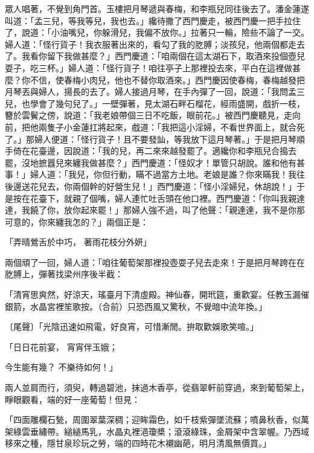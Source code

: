 眾人唱著，不覺到角門首。玉樓把月琴遞與春梅，和李瓶兒同往後去了。潘金蓮遂叫道：「孟三兒，等我等兒，我也去。」纔待撒了西門慶走，被西門慶一把手拉住了，說道：「小油嘴兒，你躲滑兒，我偏不放你。」拉著只一輪，險些不論了一交。婦人道：「怪行貨子！我衣服著出來的，看勾了我的肐膊；淡孩兒，他兩個都走去了。我看你留下我做甚麼？」西門慶道：「咱兩個在這太湖石下，取酒來投個壺兒耍子，吃三杯。」婦人道：「怪行貨子！咱往亭子上那裡投去來，平白在這裡做甚麼？你不信，使春梅小肉兒，他也不替你取酒來。」西門慶因使春梅，春梅越發把月琴丟與婦人，揚長的去了。婦人接過月琴，在手內彈了一回，說道：「我問孟三兒，也學會了幾句兒了。」一壁彈著，見太湖石畔石榴花，經雨盛開，戲折一枝，簪於雲鬢之傍，說道：「我老娘帶個三日不吃飯，眼前花。」被西門慶聽見，走向前，把他兩隻子小金蓮扛將起來，戲道：「我把這小淫婦，不看世界面上，就合死了。」那婦人便道：「怪行貨子！且不要發訕，等我放下這月琴著。」于是把月琴順手倚在花臺邊，因說道：「我的兒，再二來來越發罷了。適纔你和李瓶兒合搗去罷，沒地摭囂兒來纏我做甚麼？」西門慶道：「怪奴才！單管只胡說。誰和他有甚事！」婦人道：「我兒，你但行動，瞞不過當方土地。老娘是誰？你來瞞我！我往後邊送花兒去，你兩個幹的好營生兒！」西門慶道：「怪小淫婦兒，休胡說！」于是按在花臺下，就親了個嘴，婦人連忙吐舌頭在他口裡。西門慶道：「你叫我親達達，我饒了你，放你起來罷！」那婦人強不過，叫了他聲：「親達達，我不是你那可意的，你來纏我怎的？」兩個正是：

「弄晴鶯舌於中巧，  著雨花枝分外妍」

兩個頑了一回，婦人道：「咱往葡萄架那裡投壺耍子兒去走來！于是把月琴跨在在肐膊上，彈著找梁州序後半截：

「清宵思爽然，好涼天，瑤臺月下清虛殿。神仙春，開玳筵，重歡宴。任教玉漏催銀箭，水晶宮裡笙歌按。（合前）只恐西風又驚秋，不覺暗中流年換。」

〔尾聲〕「光陰迅速如飛電，好良宵，可惜漸閒。拚取歡娛歌笑喧。」

「日日花前宴，  宵宵伴玉娥；

今生能有幾？  不樂待如何！」

兩人並肩而行，須臾，轉過碧池，抹過木香亭，從翡翠軒前穿過，來到葡萄架上，睜眼觀看，端的好一座葡萄！但見：

「四面雕欄石甃，周圍翠葉深稠；迎眸霜色，如千枝紫彈墜流蘇；噴鼻秋香，似萬架綠雲垂繡帶。縋縋馬乳，水晶丸裡浥瓊槳；滾滾綠珠，金屑架中含翠幄。乃西域移來之種，隱甘泉珍玩之勞，端的四時花木襯幽葩，明月清風無價買。」


